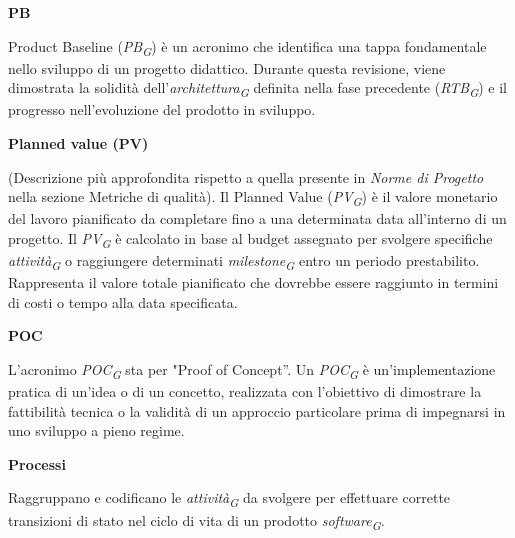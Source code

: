 \documentclass{article}
\begin{document}
\textbf{PB}

\vspace{0.1cm}

Product Baseline (\textit{PB}\textsubscript{\textit{G}}) è un acronimo che identifica una tappa fondamentale nello sviluppo di un progetto didattico. Durante questa revisione, viene dimostrata la solidità dell'\textit{architettura}\textsubscript{\textit{G}} definita nella fase precedente (\textit{RTB}\textsubscript{\textit{G}}) e il progresso nell'evoluzione del prodotto in sviluppo.

\vspace{0.4cm}

\textbf{Planned value (PV)}

\vspace{0.1cm}

(Descrizione più approfondita rispetto a quella presente in \textit{Norme di Progetto} nella sezione Metriche di qualità). 
Il Planned Value (\textit{PV}\textsubscript{\textit{G}}) è il valore monetario del lavoro pianificato da completare fino a una determinata data all'interno di un progetto. Il \textit{PV}\textsubscript{\textit{G}} è calcolato in base al budget assegnato per svolgere specifiche \textit{attività}\textsubscript{\textit{G}} o raggiungere determinati \textit{milestone}\textsubscript{\textit{G}} entro un periodo prestabilito. Rappresenta il valore totale pianificato che dovrebbe essere raggiunto in termini di costi o tempo alla data specificata.

\vspace{0.4cm}

\textbf{POC}

\vspace{0.1cm}

L'acronimo \textit{POC}\textsubscript{\textit{G}} sta per "Proof of Concept”. Un \textit{POC}\textsubscript{\textit{G}} è un'implementazione pratica di un'idea o di un concetto, realizzata con l'obiettivo di dimostrare la fattibilità tecnica o la validità di un approccio particolare prima di impegnarsi in uno sviluppo a pieno regime.

\vspace{0.4cm}

\textbf{Processi}

\vspace{0.1cm}

Raggruppano e codificano le \textit{attività}\textsubscript{\textit{G}} da svolgere per effettuare corrette transizioni di stato nel ciclo di vita di un prodotto \textit{software}\textsubscript{\textit{G}}.
\end{document}
